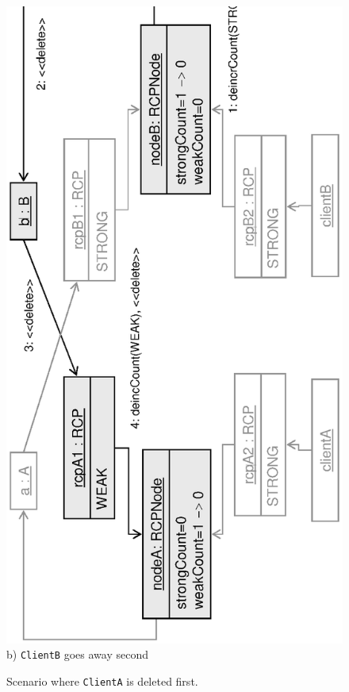 \documentclass[pdf,ps2pdf,11pt]{SANDreport}
\begin{document}
{\begin{figure}
\begin{center}
\includegraphics*[angle=270,scale=0.65]{CircularRCP_A_B_ClientA_2}
\\[2ex] b) {}\texttt{ClientB} goes away second \\[3ex]
\end{center}
\caption{
\label{fig:CircularRCP_A_B_ClientA}
Scenario where {}\texttt{ClientA} is deleted first.  }
\end{figure}
\esinglespace}
\end{document}
